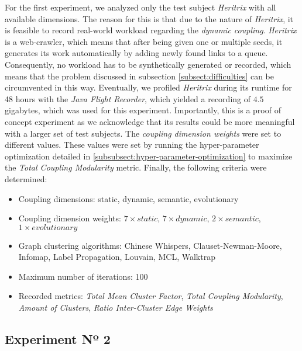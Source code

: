 \documentclass[12pt,a4paper]{report}
\begin{document}
For the first experiment, we analyzed only the
test subject \textit{Heritrix} with all available dimensions. The reason for
this is that due to the nature of \textit{Heritrix}, it is feasible to record
real\hyp world workload regarding the \textit{dynamic coupling}. \textit{
Heritrix} is a web\hyp crawler, which means that after being given one or
multiple seeds, it generates its work automatically by adding newly found links
to a queue. Consequently, no workload has to be synthetically generated or
recorded, which means that the problem discussed in subsection
\ref{subsect:difficulties} can be circumvented in this way.
Eventually, we profiled \textit{Heritrix} during its runtime
for 48 hours with the \textit{Java Flight Recorder},
which yielded a recording of $4.5$ gigabytes, which was used for
this experiment. Importantly, this is a proof of concept experiment as we
acknowledge that its results could be more meaningful with a larger set of test
subjects. The \textit{coupling dimension weights} were set to
different values. These values were set by running the hyper\hyp parameter
optimization detailed in \ref{subsubsect:hyper-parameter-optimization} to
maximize the \textit{Total Coupling Modularity} metric. Finally, the following
criteria were determined:
\begin{itemize}[noitemsep]
    \item Coupling dimensions: static, dynamic, semantic, evolutionary
    \item Coupling dimension weights: $7 \times static$, $7 \times dynamic$, $2 \times semantic$, $1 \times evolutionary$
    \item Graph clustering algorithms: Chinese Whispers, Clauset-Newman-Moore, Infomap, Label Propagation, Louvain, MCL, Walktrap
    \item Maximum number of iterations: 100
    \item Recorded metrics:
    \textit{Total Mean Cluster Factor},
    \textit{Total Coupling Modularity},
    \textit{Amount of Clusters},
    \textit{Ratio Inter-Cluster Edge Weights}
\end{itemize}


\subsection{Experiment Nº 2}
\end{document}
